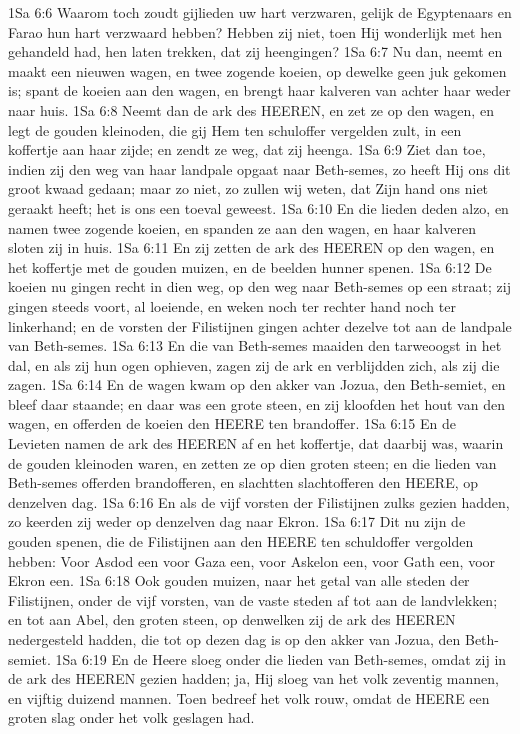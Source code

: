 1Sa 6:6  Waarom toch zoudt gijlieden uw hart verzwaren, gelijk de Egyptenaars en Farao hun hart verzwaard hebben? Hebben zij niet, toen Hij wonderlijk met hen gehandeld had, hen laten trekken, dat zij heengingen?
1Sa 6:7  Nu dan, neemt en maakt een nieuwen wagen, en twee zogende koeien, op dewelke geen juk gekomen is; spant de koeien aan den wagen, en brengt haar kalveren van achter haar weder naar huis.
1Sa 6:8  Neemt dan de ark des HEEREN, en zet ze op den wagen, en legt de gouden kleinoden, die gij Hem ten schuloffer vergelden zult, in een koffertje aan haar zijde; en zendt ze weg, dat zij heenga.
1Sa 6:9  Ziet dan toe, indien zij den weg van haar landpale opgaat naar Beth-semes, zo heeft Hij ons dit groot kwaad gedaan; maar zo niet, zo zullen wij weten, dat Zijn hand ons niet geraakt heeft; het is ons een toeval geweest.
1Sa 6:10  En die lieden deden alzo, en namen twee zogende koeien, en spanden ze aan den wagen, en haar kalveren sloten zij in huis.
1Sa 6:11  En zij zetten de ark des HEEREN op den wagen, en het koffertje met de gouden muizen, en de beelden hunner spenen.
1Sa 6:12  De koeien nu gingen recht in dien weg, op den weg naar Beth-semes op een straat; zij gingen steeds voort, al loeiende, en weken noch ter rechter hand noch ter linkerhand; en de vorsten der Filistijnen gingen achter dezelve tot aan de landpale van Beth-semes.
1Sa 6:13  En die van Beth-semes maaiden den tarweoogst in het dal, en als zij hun ogen ophieven, zagen zij de ark en verblijdden zich, als zij die zagen.
1Sa 6:14  En de wagen kwam op den akker van Jozua, den Beth-semiet, en bleef daar staande; en daar was een grote steen, en zij kloofden het hout van den wagen, en offerden de koeien den HEERE ten brandoffer.
1Sa 6:15  En de Levieten namen de ark des HEEREN af en het koffertje, dat daarbij was, waarin de gouden kleinoden waren, en zetten ze op dien groten steen; en die lieden van Beth-semes offerden brandofferen, en slachtten slachtofferen den HEERE, op denzelven dag.
1Sa 6:16  En als de vijf vorsten der Filistijnen zulks gezien hadden, zo keerden zij weder op denzelven dag naar Ekron.
1Sa 6:17  Dit nu zijn de gouden spenen, die de Filistijnen aan den HEERE ten schuldoffer vergolden hebben: Voor Asdod een voor Gaza een, voor Askelon een, voor Gath een, voor Ekron een.
1Sa 6:18  Ook gouden muizen, naar het getal van alle steden der Filistijnen, onder de vijf vorsten, van de vaste steden af tot aan de landvlekken; en tot aan Abel, den groten steen, op denwelken zij de ark des HEEREN nedergesteld hadden, die tot op dezen dag is op den akker van Jozua, den Beth-semiet.
1Sa 6:19  En de Heere sloeg onder die lieden van Beth-semes, omdat zij in de ark des HEEREN gezien hadden; ja, Hij sloeg van het volk zeventig mannen, en vijftig duizend mannen. Toen bedreef het volk rouw, omdat de HEERE een groten slag onder het volk geslagen had.

